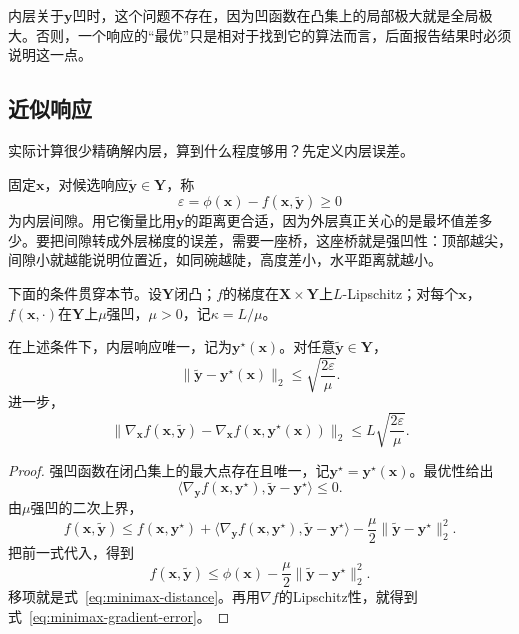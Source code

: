 内层关于$\bm{y}$凹时，这个问题不存在，因为凹函数在凸集上的局部极大就是全局极大。否则，一个响应的“最优”只是相对于找到它的算法而言，后面报告结果时必须说明这一点。

\subsection{近似响应}
\label{sec:minimax-approx-response}

实际计算很少精确解内层，算到什么程度够用？先定义内层误差。

固定$\bm{x}$，对候选响应$\tilde{\bm{y}}\in\bm{Y}$，称
\begin{equation}
 \varepsilon=\phi(\bm{x})-f(\bm{x},\tilde{\bm{y}})\geq0
 \label{eq:minimax-inner-gap}
\end{equation}
为内层间隙。用它衡量比用$\bm{y}$的距离更合适，因为外层真正关心的是最坏值差多少。要把间隙转成外层梯度的误差，需要一座桥，这座桥就是强凹性：顶部越尖，间隙小就越能说明位置近，如同碗越陡，高度差小，水平距离就越小。

下面的条件贯穿本节。设$\bm{Y}$闭凸；$f$的梯度在$\bm{X}\times\bm{Y}$上$L$-Lipschitz；对每个$\bm{x}$，$f(\bm{x},\cdot)$在$\bm{Y}$上$\mu$强凹，$\mu>0$，记$\kappa=L/\mu$。

\begin{theorem}[内层间隙到外层梯度的传递]
\label{thm:minimax-inexact-gradient}
在上述条件下，内层响应唯一，记为$\bm{y}^\star(\bm{x})$。对任意$\tilde{\bm{y}}\in\bm{Y}$，
\begin{equation}
 \lVert\tilde{\bm{y}}-\bm{y}^\star(\bm{x})\rVert_2\leq\sqrt{\frac{2\varepsilon}{\mu}}.
 \label{eq:minimax-distance}
\end{equation}
进一步，
\begin{equation}
 \bigl\lVert\nabla_{\bm{x}}f(\bm{x},\tilde{\bm{y}})-\nabla_{\bm{x}}f(\bm{x},\bm{y}^\star(\bm{x}))\bigr\rVert_2\leq L\sqrt{\frac{2\varepsilon}{\mu}}.
 \label{eq:minimax-gradient-error}
\end{equation}
\end{theorem}

\begin{proof}
强凹函数在闭凸集上的最大点存在且唯一，记$\bm{y}^\star=\bm{y}^\star(\bm{x})$。最优性给出
\[
 \langle\nabla_{\bm{y}}f(\bm{x},\bm{y}^\star),\tilde{\bm{y}}-\bm{y}^\star\rangle\leq0.
\]
由$\mu$强凹的二次上界，
\[
 f(\bm{x},\tilde{\bm{y}})\leq f(\bm{x},\bm{y}^\star)+\langle\nabla_{\bm{y}}f(\bm{x},\bm{y}^\star),\tilde{\bm{y}}-\bm{y}^\star\rangle-\frac{\mu}{2}\lVert\tilde{\bm{y}}-\bm{y}^\star\rVert_2^2.
\]
把前一式代入，得到
\[
 f(\bm{x},\tilde{\bm{y}})\leq\phi(\bm{x})-\frac{\mu}{2}\lVert\tilde{\bm{y}}-\bm{y}^\star\rVert_2^2.
\]
移项就是式~\eqref{eq:minimax-distance}。再用$\nabla f$的Lipschitz性，就得到式~\eqref{eq:minimax-gradient-error}。
\end{proof}

